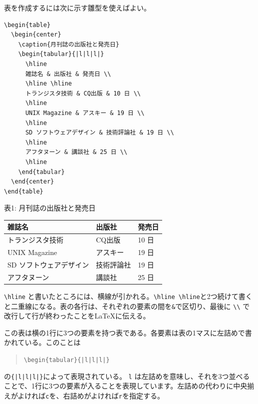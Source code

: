 表を作成するには次に示す雛型を使えばよい。
\begin{reidai}
\begin{verbatim}
\begin{table}
  \begin{center}
    \caption{月刊誌の出版社と発売日}
    \begin{tabular}{|l|l|l|}
      \hline
      雑誌名 & 出版社 & 発売日 \\
      \hline \hline
      トランジスタ技術 & CQ出版 & 10 日 \\
      \hline
      UNIX Magazine & アスキー & 19 日 \\
      \hline
      SD ソフトウェアデザイン & 技術評論社 & 19 日 \\
      \hline
      アフタヌーン & 講談社 & 25 日 \\
      \hline
    \end{tabular}
  \end{center}
\end{table}
\end{verbatim}
\end{reidai}
\vspace*{-1.5em}
\begin{kekka}
  \begin{center}
    表1: 月刊誌の出版社と発売日 \\
    \begin{tabular}{|l|l|l|}
      \hline
      雑誌名 & 出版社 & 発売日 \\
      \hline \hline
      トランジスタ技術 & CQ出版 & 10 日 \\
      \hline
      UNIX Magazine & アスキー & 19 日 \\
      \hline
      SD ソフトウェアデザイン & 技術評論社 & 19 日 \\
      \hline
      アフタヌーン & 講談社 & 25 日 \\
      \hline
    \end{tabular}
  \end{center}
\end{kekka} \noindent
\verb|\hline| と書いたところには、横線が引かれる。\verb|\hline \hline|と2つ続けて書くと二重線になる。表の各行は、それぞれの要素の間を\texttt{\&}で区切り、最後に \texttt{\textbackslash \textbackslash} で改行して行が終わったことを\LaTeX に伝える。

この表は横の1行に3つの要素を持つ表である。各要素は表の1マスに左詰めで書かれている。このことは
\begin{quotation}
  \verb-\begin{tabular}{|l|l|l|}-
\end{quotation}
の\verb-{|l|l|l|}-によって表現されている。 \texttt{l} は左詰めを意味し、それを3つ並べることで、1行に3つの要素が入ることを表現しています。左詰めの代わりに中央揃えがよければ\texttt{c}を、右詰めがよければ\texttt{r}を指定する。

